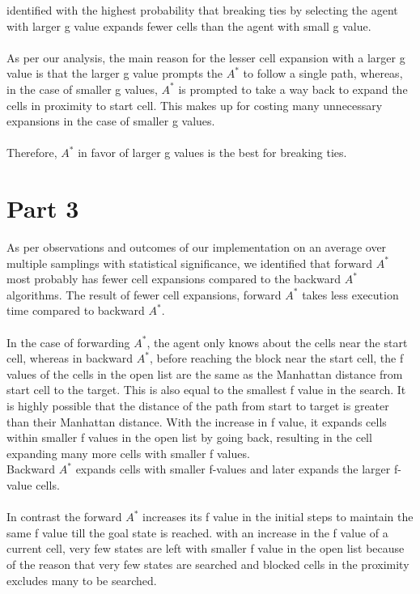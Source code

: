 \documentclass{article}
\begin{document}
identified with the highest probability that breaking ties by selecting the agent with larger g value expands fewer cells than the agent with 
small g value.\\
\\
As per our analysis, the main reason for the lesser cell expansion with a larger g value is that the larger g value prompts the $A^*$  to follow a 
single path, whereas, in the case of smaller g values, $A^*$ is prompted to take a way back to expand the cells in proximity to start cell. This makes up for costing many unnecessary expansions in the case of smaller g values.\\
\\
Therefore, $A^*$ in favor of larger g values is the best for breaking ties.\\
\section*{Part 3}
As per observations and outcomes of our implementation on an average over multiple samplings with statistical significance, we identified that forward $A^*$ most probably has fewer cell expansions compared to the backward $A^*$ algorithms. The result of fewer cell expansions, forward $A^*$ takes less execution time compared to backward $A^*$.\\
\\
In the case of forwarding $A^*$, the agent only knows about the cells near the start cell, whereas in backward $A^*$, before reaching the block near the start cell, the f values of the cells in the open list are the same as the Manhattan distance from start cell to the target. This is also equal to the smallest f value in the search. It is highly possible that the distance of the path from start to target is greater than their Manhattan distance. With the increase in f value, it expands cells within smaller f values in the open list by going back, resulting in the cell expanding many more cells with smaller f values.
\\
Backward $A^*$ expands cells with smaller f-values and later expands the larger f-value cells.\\
\\
In contrast the forward $A^*$ increases its f value in the initial steps to maintain the same f value till the goal state is reached. with an increase in the f value of a current cell, very few states are left with smaller f value in the open list because of the reason that very few states are searched and blocked cells in the proximity excludes many to be searched.\\
\end{document}
